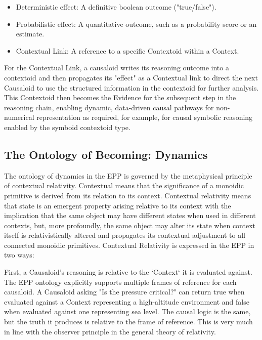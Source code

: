 \begin{itemize}
	\item Deterministic effect: A definitive boolean outcome ("true/false").
	\item Probabilistic effect: A quantitative outcome, such as a probability score or an estimate.
	\item  Contextual Link: A reference to a specific Contextoid within a Context.
\end{itemize}

For the Contextual Link,  a causaloid writes its reasoning outcome into a contextoid and then propagates its "effect" as a Contextual link to direct the next Causaloid to use the structured information in the contextoid for further analysis. This Contextoid then becomes the Evidence for the subsequent step in the reasoning chain, enabling dynamic, data-driven causal pathways for non-numerical representation as required, for example, for causal symbolic reasoning enabled by the symboid contextoid type. 

\subsection{The Ontology of Becoming: Dynamics}
\label{sec:ontology_dynamics}

The ontology of dynamics in the EPP is governed by the metaphysical principle of contextual relativity. Contextual means that the significance of a monoidic primitive is derived from its relation to its context. Contextual relativity means that state is an emergent property arising relative to its context with the implication that the same object may have different states when used in different contexts, but, more profoundly, the same object may alter its state when context itself is relativistically altered and propagates its contextual adjustment to all connected monoidic primitives. 
Contextual Relativity is expressed in the EPP in two ways:

First, a Causaloid's reasoning is relative to the `Context` it is evaluated against. The EPP ontology explicitly supports multiple frames of reference for each causaloid. A Causaloid asking "Is the pressure critical?" can return true when evaluated against a Context representing a high-altitude environment and false when evaluated against one representing sea level. The causal logic is the same, but the truth it produces is relative to the frame of reference. This is very much in line with the observer principle in the general theory of relativity. 

